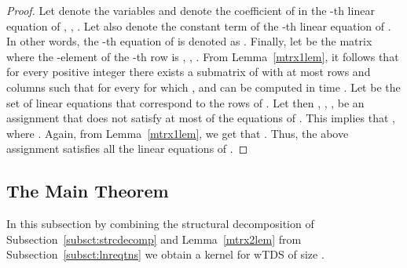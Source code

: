 \documentclass[a4paper,11pt]{article}
\begin{document}
\begin{proof}
Let  denote the  variables and  denote the coefficient of  in the -th linear equation of , , . 
Let also  denote the constant term of the -th linear equation of . In other words, the -th equation of  is denoted as
.
Finally, let  be the matrix where the -element of the -th row is 
, , . From Lemma~\ref{mtrx1lem}, it follows that
for every positive integer  there exists a submatrix  of  with at most  rows and  columns such that for every 
 for which ,  and
 can be computed in time . 
Let  be the set of linear equations that correspond to the rows of . Let then , 
, , be an assignment that does not satisfy at most  of the equations of .
This implies that , where . Again, from Lemma~\ref{mtrx1lem}, 
we get that . Thus, the above assignment satisfies all the
linear equations of .
\end{proof}

\subsection{The Main Theorem}

In this subsection by combining the structural decomposition of Subsection~\ref{subsct:strcdecomp} 
and Lemma~\ref{mtrx2lem} from Subsection~\ref{subsct:lnreqtns} we obtain a kernel for {\sc wTDS} of size .
\end{document}
